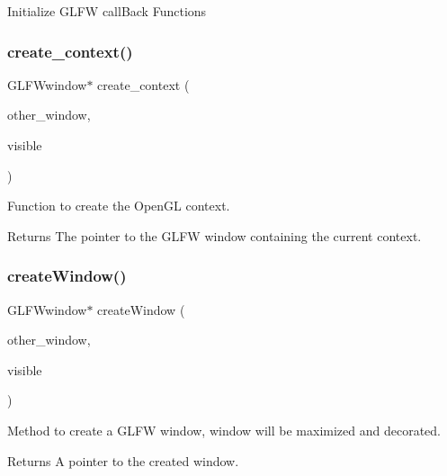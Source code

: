 Initialize G\+L\+FW call\+Back Functions \mbox{\label{Window-Management_8cpp_a9397388c884393663c7db62632ce7e3b}} 
\subsubsection{\texorpdfstring{create\+\_\+context()}{create\_context()}}
{\footnotesize\ttfamily G\+L\+F\+Wwindow$\ast$ create\+\_\+context (\begin{DoxyParamCaption}\item[{G\+L\+F\+Wwindow $\ast$}]{other\+\_\+window,  }\item[{bool}]{visible }\end{DoxyParamCaption})}

Function to create the Open\+GL context.

\begin{DoxyReturn}{Returns}
The pointer to the G\+L\+FW window containing the current context. 
\end{DoxyReturn}
\mbox{\label{Window-Management_8cpp_a9339e5430780aba11944a8d27061c58c}} 
\subsubsection{\texorpdfstring{create\+Window()}{createWindow()}}
{\footnotesize\ttfamily G\+L\+F\+Wwindow$\ast$ create\+Window (\begin{DoxyParamCaption}\item[{G\+L\+F\+Wwindow $\ast$}]{other\+\_\+window,  }\item[{bool}]{visible }\end{DoxyParamCaption})}

Method to create a G\+L\+FW window, window will be maximized and decorated.

\begin{DoxyReturn}{Returns}
A pointer to the created window. 
\end{DoxyReturn}
\mbox{\label{Window-Management_8cpp_ab9a970cff09c5a4031b814242706b4f6}} 
